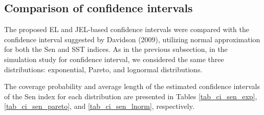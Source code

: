 \documentclass[11pt]{article}
\begin{document}
\subsection{Comparison of confidence intervals}
The proposed EL and JEL-based confidence intervals were compared with the confidence interval suggested by Davidson (2009), utilizing normal approximation for both the Sen and SST indices. As in the previous subsection, in the simulation study for confidence interval, we considered the same three distributions: exponential, Pareto, and lognormal distributions.

 The  coverage probability and average length of the estimated confidence intervals of the Sen index for each distribution are presented in Tables \ref{tab_ci_sen_exp}, \ref{tab_ci_sen_pareto}, and \ref{tab_ci_sen_lnorm}, respectively.
\end{document}
